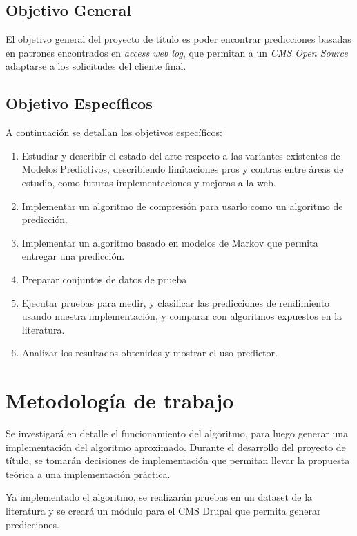 \documentclass{udparticle}
\begin{document}
\subsection{Objetivo General}
 
El objetivo general del proyecto de título es poder encontrar predicciones basadas en patrones encontrados en \emph{access web log}, que permitan a un \emph{CMS Open Source} adaptarse a los solicitudes del cliente final.
 
\subsection{Objetivo  Específicos }
 
A continuación se detallan los objetivos específicos:
 
\begin{enumerate}
  \item Estudiar y describir el estado del arte respecto a las variantes existentes de Modelos Predictivos, describiendo limitaciones pros y contras entre áreas de estudio, como futuras implementaciones y mejoras a la web.
  \item Implementar un algoritmo de compresión para usarlo como un algoritmo de predicción.
  \item Implementar un algoritmo basado en modelos de Markov que permita entregar una predicción.
  \item Preparar conjuntos de datos de prueba 
  \item Ejecutar pruebas para medir, y clasificar las predicciones de rendimiento usando nuestra implementación, y comparar con algoritmos expuestos en la literatura.
  \item Analizar los resultados obtenidos y mostrar el uso predictor.
\end{enumerate}


\section{Metodología de trabajo}

Se investigará en detalle el funcionamiento del algoritmo, para luego generar una implementación del algoritmo aproximado.
Durante el desarrollo del proyecto de título, se tomarán decisiones de implementación que permitan llevar la propuesta teórica a una implementación práctica.

Ya implementado el algoritmo, se realizarán pruebas en un dataset de la literatura y se creará un módulo para el CMS Drupal que permita generar predicciones.
\end{document}
